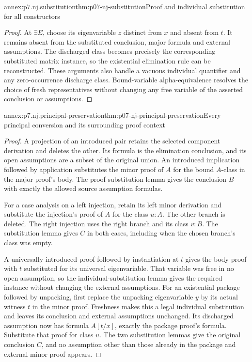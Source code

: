 \begin{annexitem}{annex:p7.nj.substitution}{thm:p07-nj-substitution}{Proof and individual substitution for all constructors}
\begin{proof}
At \(\exists E\), choose its eigenvariable \(z\) distinct
from \(x\) and absent from \(t\). It remains absent from
the substituted conclusion, major formula and external
assumptions. The discharged class becomes precisely the
corresponding substituted matrix instance, so the existential
elimination rule can be reconstructed. These arguments also
handle a vacuous individual quantifier and any zero-occurrence
discharge class. Bound-variable alpha-equivalence resolves
the choice of fresh representatives without changing any free
variable of the asserted conclusion or assumptions.
\end{proof}
\end{annexitem}

\begin{annexitem}{annex:p7.nj.principal-preservation}{thm:p07-nj-principal-preservation}{Every principal conversion and its surrounding proof context}
\begin{proof}
A projection of an introduced pair retains the selected
component derivation and deletes the other. Its formula is
the elimination conclusion, and its open assumptions are a
subset of the original union. An introduced implication
followed by application substitutes the minor proof of \(A\)
for the bound \(A\)-class in the major proof's body. The
proof-substitution lemma gives the conclusion \(B\) with
exactly the allowed source assumption formulas.

For a case analysis on a left injection, retain its left
minor derivation and substitute the injection's proof of
\(A\) for the class \(u:A\). The other branch is deleted.
The right injection uses the right branch and its class
\(v:B\). The substitution lemma gives \(C\) in both
cases, including when the chosen branch's class was empty.

A universally introduced proof followed by instantiation at
\(t\) gives the body proof with \(t\) substituted for its
universal eigenvariable. That variable was free in no open
assumption, so the individual-substitution lemma gives the
required instance without changing the external assumptions.
For an existential package followed by unpacking, first
replace the unpacking eigenvariable \(y\) by its actual
witness \(t\) in the minor proof. Freshness makes this a
legal individual substitution and leaves its conclusion and
external assumptions unchanged. Its discharged assumption
now has formula \(A[t/x]\), exactly the package proof's
formula. Substitute that proof for class \(u\). The two
substitution lemmas give the original conclusion \(C\),
and no assumption other than those already in the package
and external minor proof appears.


\end{proof}
\end{annexitem}
